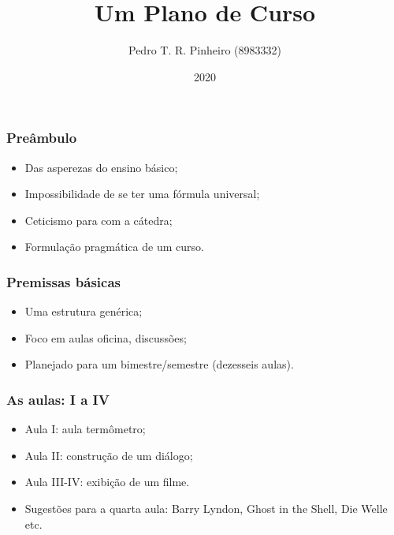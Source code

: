 \documentclass[12pt]{beamer}
\begin{document}
	\author{Pedro T. R. Pinheiro (8983332)}
	\title{Um Plano de Curso}
	\date{2020}
	\begin{frame}[plain]
	\maketitle
\end{frame}

\begin{frame}
\frametitle{Preâmbulo}

	\begin{itemize}
		\item Das asperezas do ensino básico; 
		\item Impossibilidade de se ter uma fórmula universal; 
		\item Ceticismo para com a cátedra; 
		\item Formulação pragmática de um curso. 
	\end{itemize}

\end{frame}

\begin{frame}
\frametitle{Premissas básicas}

	\begin{itemize}
		\item Uma estrutura genérica; 
		\item Foco em aulas oficina, discussões; 
		\item Planejado para um bimestre/semestre (dezesseis aulas). 
	\end{itemize}

\end{frame}

\begin{frame}
\frametitle{As aulas: I a IV}

	\begin{itemize}
		\item Aula I: aula termômetro; 
		\item Aula II: construção de um diálogo; 
		\item Aula III-IV: exibição de um filme. 
		\item Sugestões para a quarta aula: Barry Lyndon, Ghost in the Shell, 
		Die Welle etc. 
	\end{itemize}

\end{frame}
\end{document}
